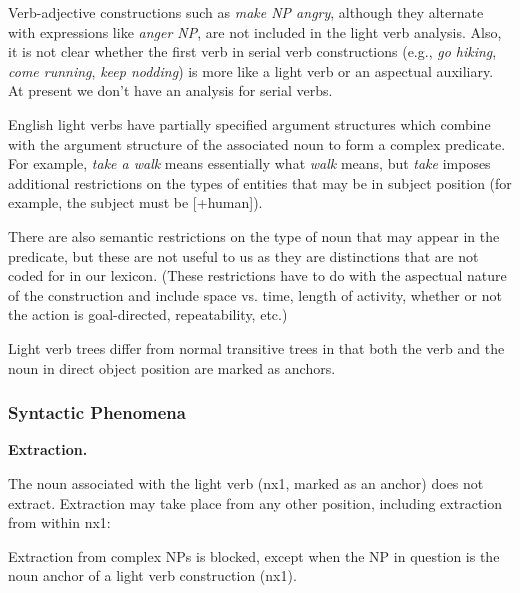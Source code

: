 Verb-adjective constructions such as {\it make NP angry}, although they
alternate with expressions like {\it anger NP}, are not included in the
light verb analysis.  Also, it is not clear whether the first verb in
serial verb constructions (e.g., {\it go hiking}, {\it come running}, {\it
keep nodding}) is more like a light verb or an aspectual auxiliary.  At
present we don't have an analysis for serial verbs.

English light verbs have partially specified argument structures which
combine with the argument structure of the associated noun to form a
complex predicate.  For example, {\it take a walk} means essentially what
{\it walk} means, but {\it take} imposes additional restrictions on the
types of entities that may be in subject position (for example, the subject
must be [+human]).

There are also semantic restrictions on the type of noun that may appear in
the predicate, but these are not useful to us as they are distinctions that
are not coded for in our lexicon.  (These restrictions have to do with the
aspectual nature of the construction and include space vs. time, length of
activity, whether or not the action is goal-directed, repeatability, etc.)

Light verb trees differ from normal transitive trees in that both the verb
and the noun in direct object position are marked as anchors.

\subsubsection{Syntactic Phenomena}

{\bf Extraction.}

The noun associated with the light verb (nx1, marked as an anchor) does not
extract.  Extraction may take place from any other position, including
extraction from within nx1:



Extraction from complex NPs is blocked, except when the NP in question is
the noun anchor of a light verb construction (nx1).



